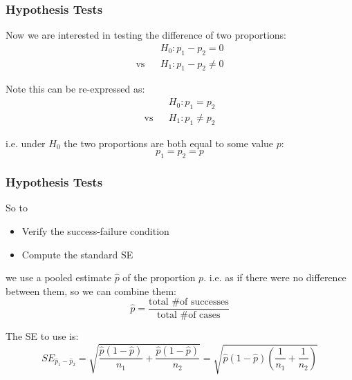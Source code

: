 \documentclass[handout]{beamer}
\newcommand{\blue}[1]{\textcolor{blue2}{#1}}
\newcommand{\phat}{\widehat{p}}
\begin{document}
\begin{frame}[fragile]
\frametitle{Hypothesis Tests}
Now we are interested in testing the difference of two proportions:
\begin{eqnarray*}
&&H_0: p_1 - p_2 = 0\\
\mbox{vs}&&H_1: p_1 - p_2 \neq 0
\end{eqnarray*}

\pause Note this can be re-expressed as:
\begin{eqnarray*}
&&H_0: p_1 = p_2\\
\mbox{vs}&&H_1: p_1 \neq p_2
\end{eqnarray*}

\vspace{0.25cm}

\pause i.e. under $H_0$ the two proportions are both equal to some value $p$:
\[p_1=p_2=p\]

\end{frame}


\begin{frame}[fragile]
\frametitle{Hypothesis Tests}

%
%
So to
\begin{itemize}
\item Verify the success-failure condition
\item Compute the standard SE
\end{itemize}
\pause we use a \blue{pooled estimate} $\widehat{p}$ of the proportion $p$.  i.e. as if there were \blue{no difference} between them, so we can combine them:
\[
\widehat{p} = \frac{\mbox{total \# of successes}}{\mbox{total \# of cases}} %
\]

\pause The SE to use is:
\[
SE_{\phat_1 - \phat_2} = \sqrt{\frac{\widehat{p}(1-\widehat{p})}{n_1} + \frac{\widehat{p}(1-\widehat{p})}{n_2}}
=
\sqrt{\widehat{p}(1-\widehat{p})\left(\frac{1}{n_1} + \frac{1}{n_2}\right)}
\]

\end{frame}
\end{document}
